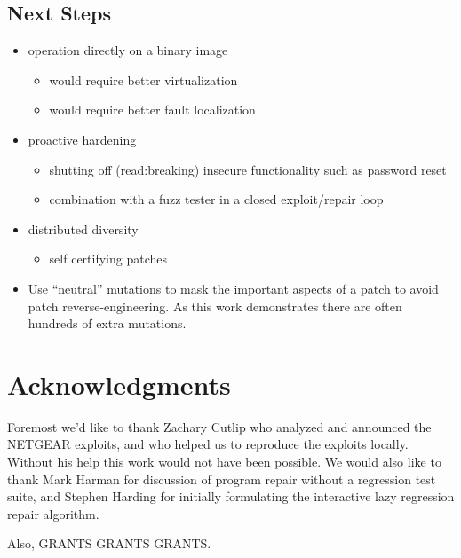 \documentclass{sigcomm-alternate}
\begin{document}
\subsection{Next Steps}
\label{sec-6-2}

\begin{itemize}
\item operation directly on a binary image
\begin{itemize}
\item would require better virtualization
\item would require better fault localization
\end{itemize}
\item proactive hardening
\begin{itemize}
\item shutting off (read:breaking) insecure functionality such as
password reset
\item combination with a fuzz tester in a closed exploit/repair loop
\end{itemize}
\item distributed diversity
\begin{itemize}
\item self certifying patches
\end{itemize}
\item Use ``neutral'' mutations to mask the important aspects of a
  patch to avoid patch reverse-engineering.  As this work demonstrates
  there are often hundreds of extra mutations.
\end{itemize}

\section{Acknowledgments}
\label{sec-7}
Foremost we'd like to thank Zachary Cutlip who analyzed and announced
the NETGEAR exploits, and who helped us to reproduce the exploits
locally.  Without his help this work would not have been possible.  We
would also like to thank Mark Harman for discussion of program repair
without a regression test suite, and Stephen Harding for initially
formulating the interactive lazy regression repair algorithm.

Also, GRANTS GRANTS GRANTS.



\end{document}
